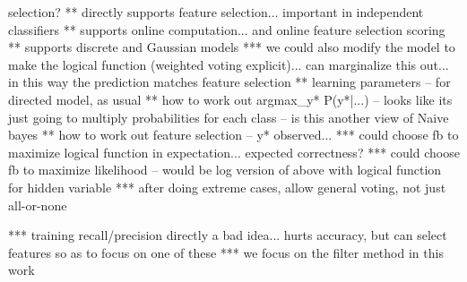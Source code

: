 selection?
** directly supports feature selection... important in independent classifiers
** supports online computation... and online feature selection scoring
** supports discrete and Gaussian models
*** we could also modify the model to make the logical function (weighted voting explicit)... can marginalize this out... in this way the 
prediction matches feature selection
** learning parameters -- for directed model, as usual
** how to work out argmax_y* P(y*|...) -- looks like its just going to multiply probabilities for each class -- is this another view of 
Naive bayes
** how to work out feature selection -- y* observed...
*** could choose fb to maximize logical function in expectation... expected correctness?
*** could choose fb to maximize likelihood -- would be log version of above with logical function for hidden variable
*** after doing extreme cases, allow general voting, not just all-or-none

*** training recall/precision directly a bad idea... hurts accuracy, but can select features so as to focus on one of these
*** we focus on the filter method in this work
\ENDCOMMENT
